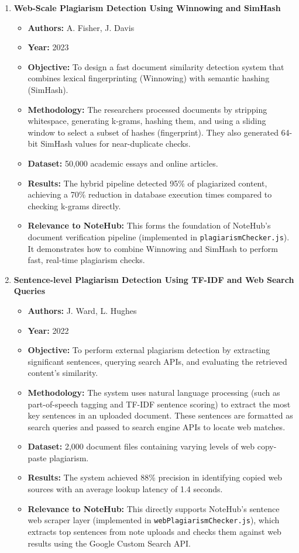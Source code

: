 \documentclass[12,Times new Roman,a4paper]{report}
\begin{document}
\begin{enumerate}
    \item \textbf{Web-Scale Plagiarism Detection Using Winnowing and SimHash}
    \begin{itemize}
        \item \textbf{Authors:} A. Fisher, J. Davis
        \item \textbf{Year:} 2023
        \item \textbf{Objective:} To design a fast document similarity detection system that combines lexical fingerprinting (Winnowing) with semantic hashing (SimHash).
        \item \textbf{Methodology:} The researchers processed documents by stripping whitespace, generating k-grams, hashing them, and using a sliding window to select a subset of hashes (fingerprint). They also generated 64-bit SimHash values for near-duplicate checks.
        \item \textbf{Dataset:} 50,000 academic essays and online articles.
        \item \textbf{Results:} The hybrid pipeline detected 95\% of plagiarized content, achieving a 70\% reduction in database execution times compared to checking k-grams directly.
        \item \textbf{Relevance to NoteHub:} This forms the foundation of NoteHub's document verification pipeline (implemented in \texttt{plagiarismChecker.js}). It demonstrates how to combine Winnowing and SimHash to perform fast, real-time plagiarism checks.
    \end{itemize}

    \item \textbf{Sentence-level Plagiarism Detection Using TF-IDF and Web Search Queries}
    \begin{itemize}
        \item \textbf{Authors:} J. Ward, L. Hughes
        \item \textbf{Year:} 2022
        \item \textbf{Objective:} To perform external plagiarism detection by extracting significant sentences, querying search APIs, and evaluating the retrieved content's similarity.
        \item \textbf{Methodology:} The system uses natural language processing (such as part-of-speech tagging and TF-IDF sentence scoring) to extract the most key sentences in an uploaded document. These sentences are formatted as search queries and passed to search engine APIs to locate web matches.
        \item \textbf{Dataset:} 2,000 document files containing varying levels of web copy-paste plagiarism.
        \item \textbf{Results:} The system achieved 88\% precision in identifying copied web sources with an average lookup latency of 1.4 seconds.
        \item \textbf{Relevance to NoteHub:} This directly supports NoteHub's sentence web scraper layer (implemented in \texttt{webPlagiarismChecker.js}), which extracts top sentences from note uploads and checks them against web results using the Google Custom Search API.
    \end{itemize}


\end{enumerate}
\end{document}

